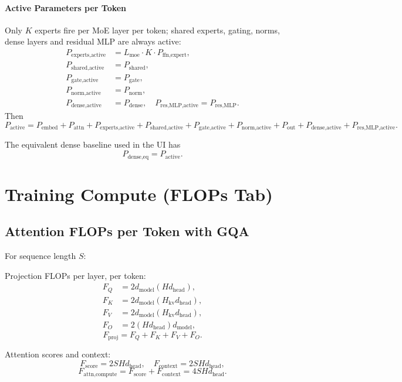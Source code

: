 \documentclass[11pt]{article}
\begin{document}
\paragraph{Active Parameters per Token}
Only $K$ experts fire per MoE layer per token; shared experts,
gating, norms, dense layers and residual MLP are always active:
\begin{align*}
P_{\text{experts,active}} &= L_{\text{moe}} \cdot K \cdot P_{\text{ffn,expert}}, \\
P_{\text{shared,active}}  &= P_{\text{shared}}, \\
P_{\text{gate,active}}    &= P_{\text{gate}}, \\
P_{\text{norm,active}}    &= P_{\text{norm}}, \\
P_{\text{dense,active}}   &= P_{\text{dense}}, \quad
P_{\text{res,MLP,active}} = P_{\text{res,MLP}}.
\end{align*}
Then
\[
P_{\text{active}} =
P_{\text{embed}} + P_{\text{attn}} +
P_{\text{experts,active}} + P_{\text{shared,active}}
+ P_{\text{gate,active}} + P_{\text{norm,active}} + P_{\text{out}}
+ P_{\text{dense,active}} + P_{\text{res,MLP,active}}.
\]

The equivalent dense baseline used in the UI has
\[
P_{\text{dense,eq}} = P_{\text{active}}.
\]

\section{Training Compute (FLOPs Tab)}

\subsection{Attention FLOPs per Token with GQA}

For sequence length $S$:

Projection FLOPs per layer, per token:
\begin{align*}
F_Q &= 2 d_{\text{model}} (H d_{\text{head}}), \\
F_K &= 2 d_{\text{model}} (H_{\text{kv}} d_{\text{head}}), \\
F_V &= 2 d_{\text{model}} (H_{\text{kv}} d_{\text{head}}), \\
F_O &= 2 (H d_{\text{head}}) d_{\text{model}},
\end{align*}
\[
F_{\text{proj}} = F_Q + F_K + F_V + F_O.
\]

Attention scores and context:
\[
F_{\text{score}}   = 2 S H d_{\text{head}}, \quad
F_{\text{context}} = 2 S H d_{\text{head}},
\]
\[
F_{\text{attn,compute}} = F_{\text{score}} + F_{\text{context}}
= 4 S H d_{\text{head}}.
\]
\end{document}
